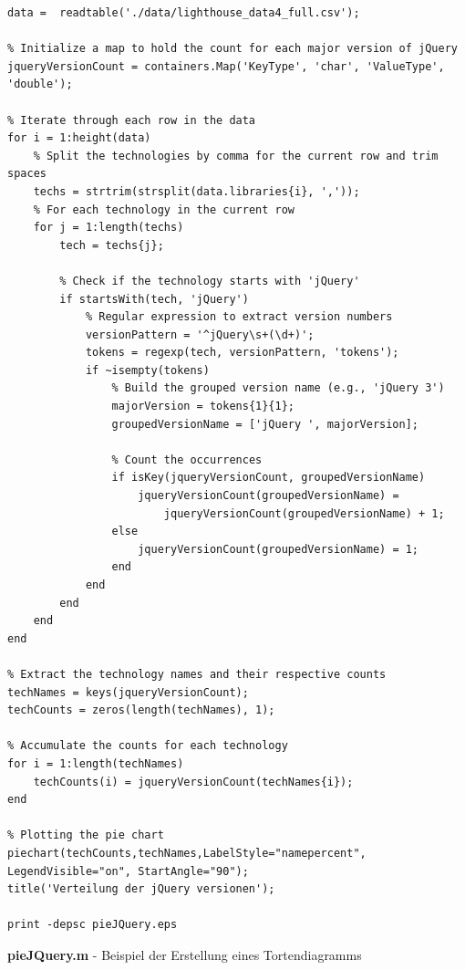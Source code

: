 \documentclass[Bachelor,BIF,german,IEEE]{BASE/twbook}
\begin{document}
\begin{listing}[htbp]
\begin{verbatim}
data =  readtable('./data/lighthouse_data4_full.csv');

% Initialize a map to hold the count for each major version of jQuery
jqueryVersionCount = containers.Map('KeyType', 'char', 'ValueType', 'double');

% Iterate through each row in the data
for i = 1:height(data)
    % Split the technologies by comma for the current row and trim spaces
    techs = strtrim(strsplit(data.libraries{i}, ','));
    % For each technology in the current row
    for j = 1:length(techs)
        tech = techs{j};
        
        % Check if the technology starts with 'jQuery'
        if startsWith(tech, 'jQuery')
            % Regular expression to extract version numbers
            versionPattern = '^jQuery\s+(\d+)';
            tokens = regexp(tech, versionPattern, 'tokens');
            if ~isempty(tokens)
                % Build the grouped version name (e.g., 'jQuery 3')
                majorVersion = tokens{1}{1};
                groupedVersionName = ['jQuery ', majorVersion];
                
                % Count the occurrences
                if isKey(jqueryVersionCount, groupedVersionName)
                    jqueryVersionCount(groupedVersionName) = 
                        jqueryVersionCount(groupedVersionName) + 1;
                else
                    jqueryVersionCount(groupedVersionName) = 1;
                end
            end
        end
    end
end

% Extract the technology names and their respective counts
techNames = keys(jqueryVersionCount);
techCounts = zeros(length(techNames), 1);

% Accumulate the counts for each technology
for i = 1:length(techNames)
    techCounts(i) = jqueryVersionCount(techNames{i});
end

% Plotting the pie chart
piechart(techCounts,techNames,LabelStyle="namepercent", LegendVisible="on", StartAngle="90");
title('Verteilung der jQuery versionen');

print -depsc pieJQuery.eps
\end{verbatim}
\caption{\textbf{pieJQuery.m} - Beispiel der Erstellung eines Tortendiagramms}
\end{listing}
\end{document}
